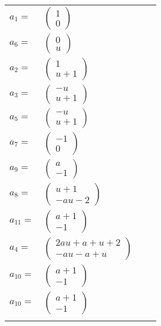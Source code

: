 \documentclass[1p]{elsarticle_modified}
\theoremstyle{definition}
\begin{document}
\begin{tabular}{m{7pt} m{180pt} m{7pt} m{180pt} }
\flushright $a_{1}=$&$\begin{pmatrix}1\\0\end{pmatrix}$ \\
\flushright $a_{6}=$&$\begin{pmatrix}0\\u\end{pmatrix}$ \\
\flushright $a_{2}=$&$\begin{pmatrix}1\\u+1\end{pmatrix}$ \\
\flushright $a_{3}=$&$\begin{pmatrix}- u\\u+1\end{pmatrix}$ \\
\flushright $a_{5}=$&$\begin{pmatrix}- u\\u+1\end{pmatrix}$ \\
\flushright $a_{7}=$&$\begin{pmatrix}-1\\0\end{pmatrix}$ \\
\flushright $a_{9}=$&$\begin{pmatrix}a\\-1\end{pmatrix}$ \\
\flushright $a_{8}=$&$\begin{pmatrix}u+1\\- a u-2\end{pmatrix}$ \\
\flushright $a_{11}=$&$\begin{pmatrix}a+1\\-1\end{pmatrix}$ \\
\flushright $a_{4}=$&$\begin{pmatrix}2 a u+a+u+2\\- a u- a+u\end{pmatrix}$ \\
\flushright $a_{10}=$&$\begin{pmatrix}a+1\\-1\end{pmatrix}$\\ \flushright $a_{10}=$&$\begin{pmatrix}a+1\\-1\end{pmatrix}$\\&\end{tabular}
\end{document}
